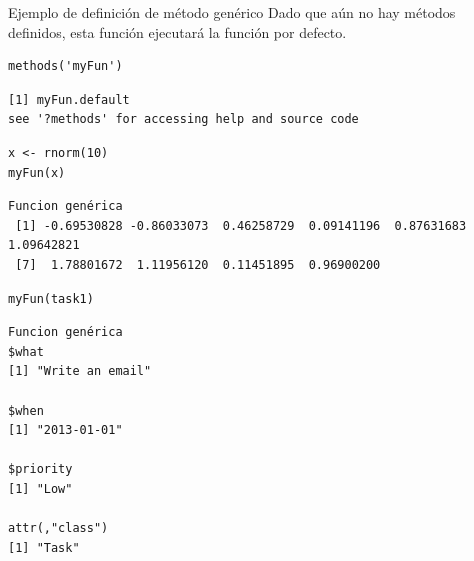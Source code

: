 \documentclass[xcolor={usenames,svgnames,dvipsnames}]{beamer}
\begin{document}
\begin{frame}[label={sec:org92bd248},fragile]{Ejemplo de definición de método genérico}
 Dado que aún no hay métodos definidos, esta función ejecutará la función por defecto.
\lstset{language=r,label= ,caption= ,captionpos=b,numbers=none}
\begin{lstlisting}
methods('myFun')
\end{lstlisting}

\begin{verbatim}
[1] myFun.default
see '?methods' for accessing help and source code
\end{verbatim}


\lstset{language=r,label= ,caption= ,captionpos=b,numbers=none}
\begin{lstlisting}
x <- rnorm(10)
myFun(x)
\end{lstlisting}

\begin{verbatim}
Funcion genérica
 [1] -0.69530828 -0.86033073  0.46258729  0.09141196  0.87631683  1.09642821
 [7]  1.78801672  1.11956120  0.11451895  0.96900200
\end{verbatim}


\lstset{language=r,label= ,caption= ,captionpos=b,numbers=none}
\begin{lstlisting}
myFun(task1)
\end{lstlisting}

\begin{verbatim}
Funcion genérica
$what
[1] "Write an email"

$when
[1] "2013-01-01"

$priority
[1] "Low"

attr(,"class")
[1] "Task"
\end{verbatim}
\end{frame}
\end{document}
